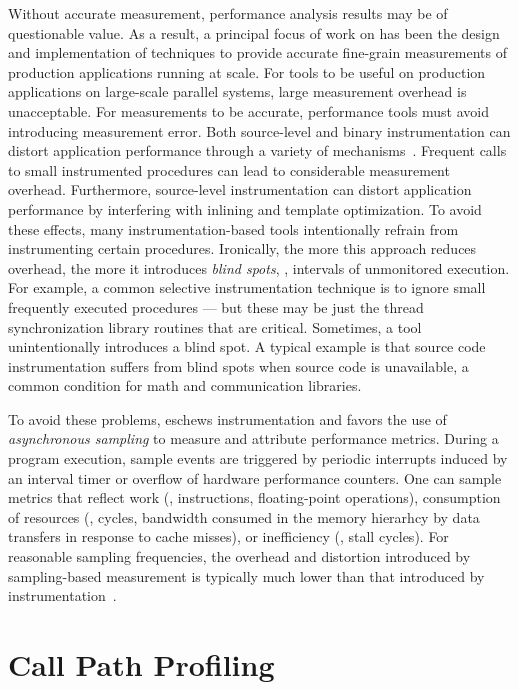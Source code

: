 \documentclass[11pt,letterpaper]{report}
\begin{document}
Without accurate measurement, performance analysis results may be of questionable value.
As a result, a principal focus of work on \HPCToolkit{} has been the design and implementation of techniques to provide accurate fine-grain measurements of production applications running at scale.
For tools to be useful on production applications on large-scale parallel systems, large measurement overhead is unacceptable.
For measurements to be accurate, performance tools must avoid introducing measurement error.
Both source-level and binary instrumentation can distort application performance through a variety of mechanisms~\cite{Mytkowicz:2009:PWD:2528521.1508275}. 
Frequent calls to small instrumented procedures can lead to considerable measurement overhead.
Furthermore, source-level instrumentation can distort application performance by interfering with inlining and template optimization. 
To avoid these effects, many instrumentation-based tools intentionally refrain from instrumenting certain procedures.
Ironically, the more this approach reduces overhead, the more it introduces \emph{blind spots}, \ie{}, intervals of unmonitored execution.
For example, a common selective instrumentation technique is to ignore small frequently executed procedures --- but these may be just the thread synchronization library routines that are critical.
Sometimes, a tool unintentionally introduces a blind spot.
A typical example is that source code instrumentation suffers from blind spots when source code is unavailable, a common condition for math and communication libraries.

To avoid these problems, \HPCToolkit{} eschews instrumentation and favors the use of \emph{asynchronous sampling} to measure and attribute performance metrics.
During a program execution, sample events are triggered by periodic interrupts induced by an interval timer or overflow of hardware performance counters.
One can sample metrics that reflect work (\eg{}, instructions, floating-point operations), consumption of resources (\eg{}, cycles, bandwidth consumed in the memory hierarhcy by data transfers in response to cache misses), or inefficiency (\eg{}, stall cycles).
For reasonable sampling frequencies, the overhead and distortion introduced by sampling-based measurement is typically much lower than that introduced by instrumentation~\cite{Froyd-MC-Fo:2005:ICS-csprof}.


\section{Call Path Profiling}
\end{document}
